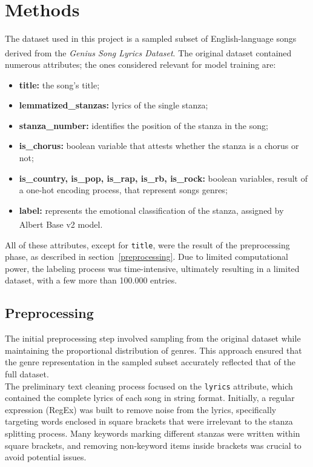 \chapter*{Methods}
\label{ch:capitolo2}
The dataset used in this project is a sampled subset of English-language
songs derived from the \textit{Genius Song Lyrics Dataset}\textsuperscript{\cite{geniusdataset}}.
The original dataset contained numerous attributes; the ones considered
relevant for model training are:
\begin{itemize}
    \item \textbf{title:} the song's title;
    
    \item \textbf{lemmatized\_stanzas:} lyrics of the single stanza;
    
    \item \textbf{stanza\_number:} identifies the position of the stanza in the song;

    \item \textbf{is\_chorus:} boolean variable that attests whether the stanza is
        a chorus or not;
    
    \item \textbf{is\_country, is\_pop, is\_rap, is\_rb, is\_rock:} boolean variables, result of a one-hot encoding process, that represent songs genres;

    \item \textbf{label:} represents the emotional classification of the stanza,
        assigned by Albert Base v2\textsuperscript{\cite{albert-base-v2}} model.
\end{itemize}
All of these attributes, except for \texttt{title}, were the result
of the preprocessing phase, as described in section~\ref{preprocessing}.
Due to limited computational power, the labeling process was time-intensive,
ultimately resulting in a limited dataset, with a few more than 100.000 entries.

\section*{Preprocessing}
\label{preprocessing}
The initial preprocessing step involved sampling from the original dataset
while maintaining the proportional distribution of genres.
This approach ensured that the genre representation in the sampled subset
accurately reflected that of the full dataset.\\

The preliminary text cleaning process focused on the \texttt{lyrics} attribute,
which contained the complete lyrics of each song in string format.
Initially, a regular expression (RegEx) was built to remove noise from the
lyrics, specifically targeting words enclosed in square brackets that were
irrelevant to the stanza splitting process. Many keywords marking different
stanzas were written within square brackets, and removing non-keyword items
inside brackets was crucial to avoid potential issues.\\

